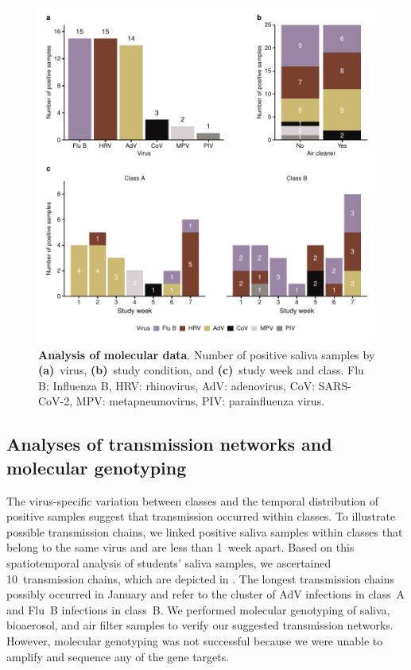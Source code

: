 \documentclass[fleqn,11pt]{wlscirep}
\begin{document}
\begin{figure}[!htpb]
    \centering
    \includegraphics{../../results/mol-data/descriptives.pdf}
    \caption{\textbf{Analysis of molecular data}. Number of positive saliva samples by \textbf{(a)}~virus, \textbf{(b)}~study condition, and \textbf{(c)}~study week and class. Flu B: Influenza B, HRV: rhinovirus, AdV: adenovirus, CoV: SARS-CoV-2, MPV: metapneumovirus, PIV: parainfluenza virus.}
    \label{fig:molecular-descriptives}
\end{figure}

\subsection{Analyses of transmission networks and molecular genotyping}

The virus-specific variation between classes and the temporal distribution of positive samples suggest that transmission occurred within classes. To illustrate possible transmission chains, we linked positive saliva samples within classes that belong to the same virus and are less than 1~week apart. Based on this spatiotemporal analysis of students' saliva samples, we ascertained 10~transmission chains, which are depicted in . The longest transmission chains possibly occurred in January and refer to the cluster of AdV infections in class~A and Flu~B infections in class~B. We performed molecular genotyping of saliva, bioaerosol, and air filter samples to verify our suggested transmission networks. However, molecular genotyping was not successful because we were unable to amplify and sequence any of the gene targets.
\end{document}
